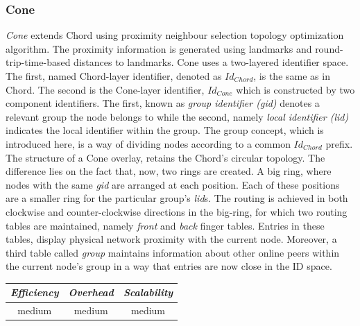 \subsubsection{Cone}
\emph{Cone} \cite{HY2007} extends Chord using proximity neighbour
selection topology optimization algorithm. The proximity information is
generated using landmarks and round-trip-time-based distances to landmarks.
Cone uses a two-layered identifier space. The first, named Chord-layer
identifier, denoted as $Id_{Chord}$, is the same as in Chord. The second is the
Cone-layer identifier, $Id_{Cone}$ which is constructed by two component
identifiers. The first, known as \emph{group identifier (gid)} denotes a
relevant group the node belongs to while the second, namely \emph{local
identifier (lid)} indicates the local identifier within the group. The group
concept, which is introduced here, is a way of dividing nodes according to a
common $Id_{Chord}$ prefix.  The structure of a Cone overlay, retains the
Chord's circular topology. The difference lies on the fact that, now, two rings
are created. A big ring, where nodes with the same \emph{gid} are arranged at
each position. Each of these positions are a smaller ring for the particular
group's \emph{lid}s. The routing is achieved in both clockwise and
counter-clockwise directions in the big-ring, for which two routing tables are
maintained, namely \emph{front} and \emph{back} finger tables. Entries in these
tables, display physical network proximity with the current node. Moreover, a
third table called \emph{group} maintains information about other online peers
within the current node's group in a way that entries are now close in the ID
space.

%
%

\begin{center}
\begin{tabular}{ccc}
\emph{Efficiency} & \emph{Overhead} & \emph{Scalability} \\
\hline
medium &
medium &
medium
\end{tabular}
\end{center}

